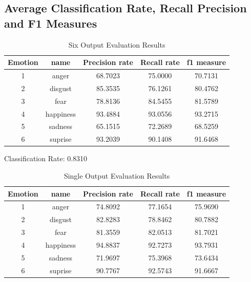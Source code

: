 \documentclass[11pt]{article}
\begin{document}
\subsection{Average Classification Rate, Recall Precision and F1 Measures}

\begin{table}[H]
\caption{Six Output Evaluation Results} %
\centering %
\begin{tabular}{c c c c c} %
\hline\hline %
Emotion & name & Precision rate & Recall rate & f1 measure\\ [0.5ex] %
\hline %
1 & anger     & 68.7023 & 75.0000 & 70.7131\\ %
2 & disgust   & 85.3535 & 76.1261 & 80.4762\\
3 & fear      & 78.8136 & 84.5455 & 81.5789\\
4 & happiness & 93.4884 & 93.0556 & 93.2715\\
5 & sadness   & 65.1515 & 72.2689 & 68.5259\\ 
6 & suprise   & 93.2039 & 90.1408 & 91.6468\\ [1ex] %
\hline %
\end{tabular}
\label{table:sixevaluation} %
\end{table}

Classification Rate: 0.8310

\begin{table}[H]
\caption{Single Output Evaluation Results} %
\centering %
\begin{tabular}{c c c c c} %
\hline\hline %
Emotion & name & Precision rate & Recall rate & f1 measure\\ [0.5ex] %
\hline %
1 & anger     & 74.8092 & 77.1654 & 75.9690\\ %
2 & disgust   & 82.8283 & 78.8462 & 80.7882\\
3 & fear      & 81.3559 & 82.0513 & 81.7021\\
4 & happiness & 94.8837 & 92.7273 & 93.7931\\
5 & sadness   & 71.9697 & 75.3968 & 73.6434\\ 
6 & suprise   & 90.7767 & 92.5743 & 91.6667\\ [1ex] %
\hline %
\end{tabular}
\label{table:singleevaluation} %
\end{table}
\end{document}
